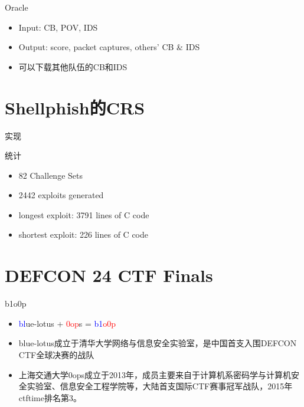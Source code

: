 \documentclass{beamer}
\begin{document}
\begin{frame}
  \begin{block}{Oracle}
    \begin{itemize}
      \item Input: CB, POV, IDS
      \item Output: score, packet captures, others' CB \& IDS
      \item 可以下载其他队伍的CB和IDS
    \end{itemize}
  \end{block}
\end{frame}

\section{Shellphish的CRS}

\begin{frame}
  \begin{block}{实现}
  \end{block}
\end{frame}

\begin{frame}
  \begin{block}{统计}
    \begin{itemize}
      \item 82 Challenge Sets
      \item 2442 exploits generated
      \item longest exploit: 3791 lines of C code
      \item shortest exploit: 226 lines of C code
    \end{itemize}
  \end{block}
\end{frame}

\section{DEFCON 24 CTF Finals}

\begin{frame}
  \begin{block}{b1o0p}
    \begin{itemize}
      \item \textcolor{blue}{bl}ue-lotus + \textcolor{red}{0op}s = \textcolor{blue}{b1}\textcolor{red}{o0p}
      \item blue-lotus成立于清华大学网络与信息安全实验室，是中国首支入围DEFCON CTF全球决赛的战队
      \item 上海交通大学0ops成立于2013年，成员主要来自于计算机系密码学与计算机安全实验室、信息安全工程学院等，大陆首支国际CTF赛事冠军战队，2015年ctftime排名第3。
    \end{itemize}
  \end{block}
\end{frame}
\end{document}
